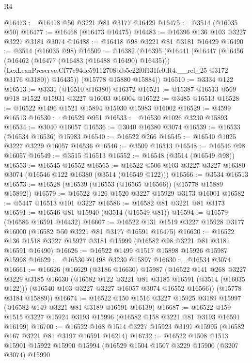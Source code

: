 \begin{lexlean}{R4}
\begin{coremodule}
@16473 := @16418 @50 @3221 @81 @3177 @16429
@16475 := @3514 (@16035 @50)
@16477 := @16468 (@16473 @16475)
@16483 := @16396 @136 @103 @3227 @3227 @3181 @3074
@16488 := @16418 @98 @3221 @81 @3181 @16429
@16490 := @3514 (@16035 @98)
@16509 := @16382
    (@16395
      (@16441
        (@16447
          (@16456
            (@16462 (@16477 (@16483 (@16488 @16490) @16435)))
            (LexLeanPreserve.Cf77c94de59112708bfb5e22f0f131fc0.R4.__rel_25 @3172 @3176 @3180))
          @16435))
      (@15778 @15880 @15884))
@16510 := @3334 @122
@16513 := @3331 (@16510 @16380) @16372
@16521 := @15387 @16513 @569 @918 @1522 @15931 @3227 @16003 @16004
@16522 := @3485 @16513
@16528 := @16522 @1496 @1521 @15894 @15930 @15983 @16002
@16529 := @4599 @16513
@16530 := @16529 @951
@16533 := @16530 @1026 @3230 @15893
@16534 := @3040 @16057
@16536 := @3040 @16380 @3074
@16539 := @16533 (@16534 @16536) @15983
@16540 := @16522 @266
@16545 := @16540 @1025 @3227 @3229 @16057 @16536
@16546 := @3509 @16513
@16548 := @16546 @98 @16057
@16549 := @3515 @16513
@16552 := @16548 (@3514 (@16549 @98))
@16553 := @16545 @16552
@16565 := @16522 @506 @103 @3227 @3227 @16380 @3074 (@16546 @122 @16380 (@3514 (@16549 @122)))
@16566 := @3534 @16513
@16573 := @16528 (@16539 (@16553 (@16565 @16566)) (@15778 @15889 @15892))
@16579 := @16522 @126 @1520 @3227 @15929 @3173 @16001
@16582 := @5447 @16513 @101 @3227
@16586 := @16582 @81 @3221 @81 @3173
@16591 := @16546 @81 @15940 (@3514 (@16549 @81))
@16594 := @16579 (@16586 @16591 @16432)
@16607 := @16522 @131 @1519 @3227 @15928 @3177 @16000 (@16582 @50 @3221 @81 @3177 @16591 @16475)
@16620 := @16522 @136 @1518 @3227 @15927 @3181 @15999 (@16582 @98 @3221 @81 @3181 @16591 @16490)
@16626 := @16522 @1499 @1517 @15898 @15926 @15987 @15998
@16629 := @16530 @1498 @3230 @15897
@16630 := @16534 @3074
@16661 := @16626
    (@16629
      (@3186 @16630)
      @15987
      (@16522
        @141
        @268
        @3227
        @3229
        @3185
        @16630
        (@16582 @122 @3221 @81 @3185 @16591 (@3514 (@16035 @122)))
        (@16540 @103 @3227 @3227 @16057 @3074 @16552 @16566))
      (@15778 @3184 @15889))
@16674 := @16522 @150 @1516 @3227 @15925 @3189 @15997 (@16582 @149 @3221 @81 @3189 @16591 @16139)
@16687 := @16522 @159 @1515 @3227 @15924 @3193 @15996 (@16582 @158 @3221 @81 @3193 @16591 @16199)
@16700 := @16522 @168 @1514 @3227 @15923 @3197 @15995 (@16582 @167 @3221 @81 @3197 @16591 @16214)
@16732 := @16522
    @1508
    @1513
    @15901
    @15922
    @15990
    @15994
    (@16529
      @1504
      @1507
      @3229
      @15900
      (@3207 @3074)
      @15990

\end{coremodule}
\end{lexlean}
